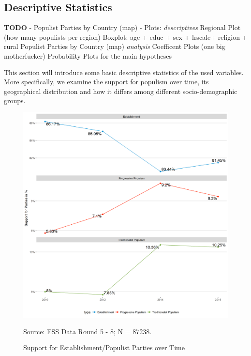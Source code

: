 \documentclass[]{article}
\title{}
\author{}
\date{}
\begin{document}
\subsection{Descriptive Statistics}\label{descriptive-statistics}

\textbf{TODO} - Populist Parties by Country (map) - Plots:
\emph{descriptives} Regional Plot (how many populists per region)
Boxplot: age + educ + sex + lrscale+ religion + rural Populist Parties
by Country (map) \emph{analysis} Coefficent Plots (one big motherfucker)
Probability Plots for the main hypotheses

This section will introduce some basic descriptive statistics of the
used variables. More specifically, we examine the support for populism
over time, its geographical distribution and how it differs among
different socio-demographic groups.

\begin{figure}[!h]
    \caption{Support for Establishment/Populist Parties over Time}
    \label{yearplot}
    \includegraphics[width=\textwidth]{images/yearplot.png}
    \flushright
    {\scriptsize Source: ESS Data Round 5 - 8; N = 87238. \par}
\end{figure}
\end{document}
